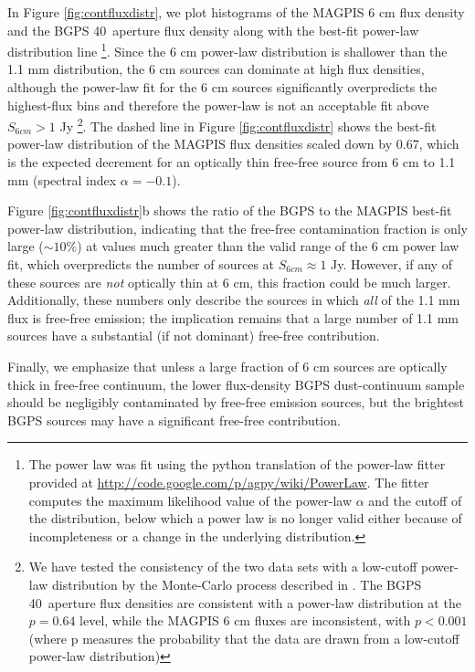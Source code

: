 In Figure
\ref{fig:contfluxdistr}, we plot histograms of the MAGPIS 6 cm flux density and
the BGPS 40\arcsec\ aperture flux density along with the best-fit power-law
distribution line \footnote{The power law was fit using the python translation
of the \citet{Clauset2009} power-law fitter provided at
\url{http://code.google.com/p/agpy/wiki/PowerLaw}.  The fitter computes the
maximum likelihood value of the power-law $\alpha$ and the cutoff of the
distribution, below which a power law is no longer valid either because of
incompleteness or a change in the underlying distribution.}.  Since the 6 cm
power-law distribution is
shallower than the 1.1 mm distribution, the 6 cm sources can dominate at high
flux densities, although the power-law fit for the 6 cm sources significantly
overpredicts the highest-flux bins and therefore the power-law is not an acceptable fit
above $S_{6 cm}>1$ Jy \footnote{We have tested the consistency of the two data
sets with a low-cutoff power-law distribution by the Monte-Carlo process
described in \citet{Clauset2009}.  The BGPS 40\arcsec\ aperture flux densities
are consistent with a power-law distribution at the $p=0.64$ level, while the
MAGPIS 6 cm fluxes are inconsistent, with $p<0.001$ (where p measures the
probability that the data are drawn from a low-cutoff power-law distribution) }.
The dashed line in Figure \ref{fig:contfluxdistr} shows the best-fit power-law
distribution of the MAGPIS flux densities scaled down by
0.67, which is the expected decrement for an optically thin free-free source 
from 6 cm to 1.1 mm
(spectral index $\alpha=-0.1$).  

Figure \ref{fig:contfluxdistr}b shows the
ratio of the BGPS to the MAGPIS best-fit power-law distribution, indicating
that the free-free contamination fraction is only large ($\sim10\%$) at values
much greater than the valid range of the 6 cm power law fit, which overpredicts the
number of sources at $S_{6 cm} \approx 1 $ Jy.  However, if any
of these sources are \emph{not} optically thin at 6 cm, this fraction could be
much larger.  Additionally, these numbers only describe the sources in which
\emph{all} of the 1.1 mm flux is free-free emission; the implication remains
that a large number of 1.1 mm sources have a substantial (if not dominant)
free-free contribution.  

Finally, we emphasize that unless a large fraction of 6 cm sources are
optically thick in free-free continuum, the lower flux-density BGPS
dust-continuum sample should be negligibly contaminated by free-free emission
sources, but the brightest BGPS sources may have a significant free-free
contribution.

